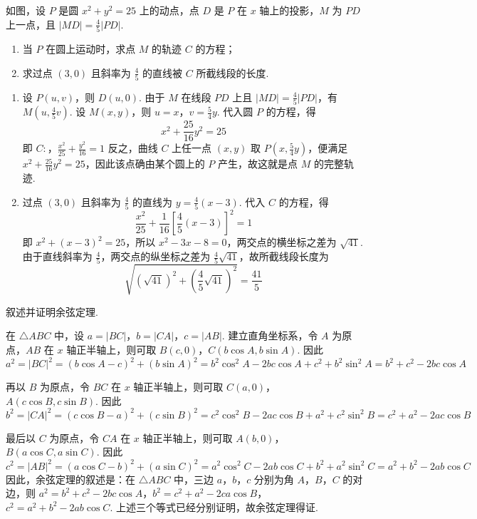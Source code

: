 \begin{problem}
如图，设 \(P\) 是圆 \(x^{2} + y^{2} = 25\) 上的动点，点 \(D\) 是 \(P\) 在 \(x\) 轴上的投影，\(M\) 为 \(PD\) 上一点，且 \(|MD| = \frac{4}{5} |PD|\).
\begin{enumerate}
\item 当 \(P\) 在圆上运动时，求点 \(M\) 的轨迹 \(C\) 的方程；
\item 求过点 \( (3,0) \) 且斜率为 \( \frac{4}{5} \) 的直线被 \(C\) 所截线段的长度.
\end{enumerate}

\end{problem}

\begin{solution}
\begin{enumerate}
\item 设 \(P(u,v)\)，则 \(D(u,0)\). 由于 \(M\) 在线段 \(PD\) 上且 \(|MD|=\frac{4}{5}|PD|\)，有 \(M\left(u,\frac{4}{5}v\right)\). 设 \(M(x,y)\)，则 \(u=x\)，\(v=\frac{5}{4}y\). 代入圆 \(P\) 的方程，得
\[
x^{2}+\frac{25}{16}y^{2}=25
\]
即
\(C:\)，\(\frac{x^{2}}{25}+\frac{y^{2}}{16}=1\)
反之，曲线 \(C\) 上任一点 \((x,y)\) 取 \(P\left(x,\frac{5}{4}y\right)\)，便满足 \(x^{2}+\frac{25}{16}y^{2}=25\)，因此该点确由某个圆上的 \(P\) 产生，故这就是点 \(M\) 的完整轨迹.
\item 过点 \((3,0)\) 且斜率为 \(\frac{4}{5}\) 的直线为 \(y=\frac{4}{5}(x-3)\). 代入 \(C\) 的方程，得
\[
\frac{x^{2}}{25}+\frac{1}{16}\left[\frac{4}{5}(x-3)\right]^{2}=1
\]
即 \(x^{2}+(x-3)^{2}=25\)，所以 \(x^{2}-3x-8=0\)，两交点的横坐标之差为 \(\sqrt{41}\). 由于直线斜率为 \(\frac{4}{5}\)，两交点的纵坐标之差为 \(\frac{4}{5}\sqrt{41}\)，故所截线段长度为
\[
\sqrt{(\sqrt{41})^{2}+\left(\frac{4}{5}\sqrt{41}\right)^{2}}=\frac{41}{5}
\]
\end{enumerate}
\end{solution}

\begin{problem}
叙述并证明余弦定理.
\end{problem}

\begin{solution}
在 \(\triangle ABC\) 中，设 \(a=|BC|\)，\(b=|CA|\)，\(c=|AB|\). 建立直角坐标系，令 \(A\) 为原点，\(AB\) 在 \(x\) 轴正半轴上，则可取 \(B(c,0)\)，\(C(b\cos A,b\sin A)\). 因此
\[
a^{2}=|BC|^{2}=(b\cos A-c)^{2}+(b\sin A)^{2}=b^{2}\cos^{2}A-2bc\cos A+c^{2}+b^{2}\sin^{2}A=b^{2}+c^{2}-2bc\cos A
\]

再以 \(B\) 为原点，令 \(BC\) 在 \(x\) 轴正半轴上，则可取 \(C(a,0)\)，\(A(c\cos B,c\sin B)\). 因此
\[
b^{2}=|CA|^{2}=(c\cos B-a)^{2}+(c\sin B)^{2}=c^{2}\cos^{2}B-2ac\cos B+a^{2}+c^{2}\sin^{2}B=c^{2}+a^{2}-2ac\cos B
\]

最后以 \(C\) 为原点，令 \(CA\) 在 \(x\) 轴正半轴上，则可取 \(A(b,0)\)，\(B(a\cos C,a\sin C)\). 因此
\[
c^{2}=|AB|^{2}=(a\cos C-b)^{2}+(a\sin C)^{2}=a^{2}\cos^{2}C-2ab\cos C+b^{2}+a^{2}\sin^{2}C=a^{2}+b^{2}-2ab\cos C
\]
因此，余弦定理的叙述是：在 \(\triangle ABC\) 中，三边 \(a\)，\(b\)，\(c\) 分别为角 \(A\)，\(B\)，\(C\) 的对边，则
\(a^{2}=b^{2}+c^{2}-2bc\cos A\)，\(b^{2}=c^{2}+a^{2}-2ca\cos B\)，\(c^{2}=a^{2}+b^{2}-2ab\cos C\). 上述三个等式已经分别证明，故余弦定理得证.
\end{solution}


